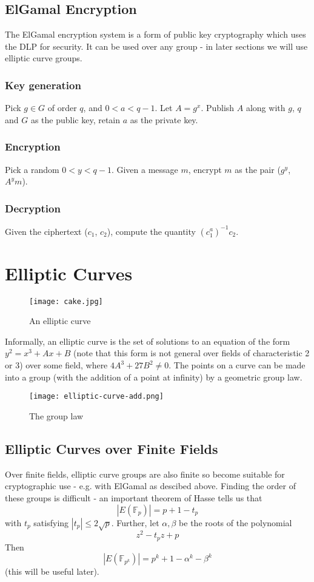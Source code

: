 \documentclass[a4paper]{article}
\begin{document}
\subsection{ElGamal Encryption}
The ElGamal encryption system is a form of public key cryptography which uses the DLP for security. It can be used over any group - in later sections we will use elliptic curve groups.

\subsubsection{Key generation}
Pick $g \in G$ of order $q$, and $0 < a < q-1$. Let $A=g^x$. Publish $A$ along with $g$, $q$ and $G$ as the public key, retain $a$ as the private key.

\subsubsection{Encryption}
Pick a random $0 < y < q-1$. Given a message $m$, encrypt $m$ as the pair ($g^y$, $A^ym$).

\subsubsection{Decryption}
Given the ciphertext ($c_1$, $c_2$), compute the quantity $(c_1^a)^{-1}c_2$.
\section{Elliptic Curves}
\begin{figure}[ht!]
	\centering
	\texttt{[image: cake.jpg]}
	\caption{An elliptic curve \label{overflow}}
\end{figure}
Informally, an elliptic curve is the set of solutions to an equation of the form $y^2 = x^3 + Ax + B$ (note that this form is not general over fields of characteristic 2 or 3) over some field, where $4A^3+27B^2 \neq 0$. The points on a curve can be made into a group (with the addition of a point at infinity) by a geometric group law.
\begin{figure}[ht!]
	\centering
	\texttt{[image: elliptic-curve-add.png]}
	\caption{The group law \label{overflow2}}
\end{figure}

\subsection{Elliptic Curves over Finite Fields}
Over finite fields, elliptic curve groups are also finite so become suitable for cryptographic use - e.g. with ElGamal as descibed above. Finding the order of these groups is difficult - an important theorem of Hasse tells us that $$|E(\mathbb{F}_p)|=p+1-t_p$$ with $t_p$ satisfying $|t_p|\leq 2\sqrt{p}$. Further, let $\alpha, \beta$ be the roots of the polynomial $$z^2-t_p z + p$$
Then $$|E(\mathbb{F}_{p^k})| = p^k + 1 - \alpha^k - \beta^k$$  (this will be useful later).
\end{document}
